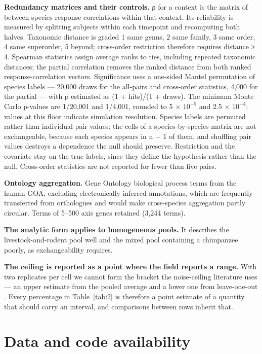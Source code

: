 \documentclass[11pt,a4paper]{article}
\begin{document}
\textbf{Redundancy matrices and their controls.} ρ for a context is the
matrix of between-species response correlations within that context. Its
reliability is measured by splitting subjects within each timepoint and
recomputing both halves. Taxonomic distance is graded 1 same genus, 2
same family, 3 same order, 4 same superorder, 5 beyond; cross-order
restriction therefore requires distance ≥ 4. Spearman statistics assign
average ranks to ties, including repeated taxonomic distances; the
partial correlation removes the ranked distance from both ranked
response-correlation vectors. Significance uses a one-sided Mantel
\cite{ref36} permutation of species labels --- 20,000 draws for the
all-pairs and cross-order statistics, 4,000 for the partial --- with p
estimated as (1 + hits)/(1 + draws). The minimum Monte Carlo p-values
are 1/20,001 and 1/4,001, rounded to 5 × \ensuremath{10^{-5}} and 2.5 × \ensuremath{10^{-4}}; values at
this floor indicate simulation resolution. Species labels are permuted
rather than individual pair values: the cells of a species-by-species
matrix are not exchangeable, because each species appears in n − 1 of
them, and shuffling pair values destroys a dependence the null should
preserve. Restriction and the covariate stay on the true labels, since
they define the hypothesis rather than the null. Cross-order statistics
are not reported for fewer than five pairs.

\textbf{Ontology aggregation.} Gene Ontology \cite{ref37} biological process
terms from the human GOA, excluding electronically inferred annotations,
which are frequently transferred from orthologues and would make
cross-species aggregation partly circular. Terms of 5--500 axis genes
retained (3,244 terms).

\textbf{The analytic form applies to homogeneous pools.} It describes
the livestock-and-rodent pool well and the mixed pool containing a
chimpanzee poorly, as exchangeability requires.

\textbf{The ceiling is reported as a point where the field reports a
range.} With two replicates per cell we cannot form the bracket the
noise-ceiling literature uses --- an upper estimate from the pooled
average and a lower one from leave-one-out \cite{ref24}. Every percentage in
Table~\ref{tab:2} is therefore a point estimate of a quantity that should carry an
interval, and comparisons between rows inherit that.

\section{Data and code availability}\label{data-and-code-availability}
\end{document}

